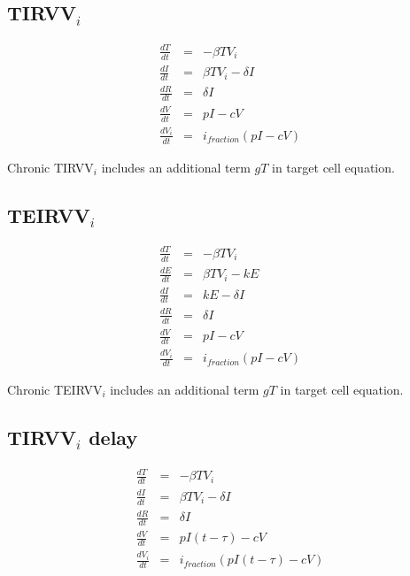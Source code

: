 \subsection{TIRVV$_i$}

\begin{equation}
\begin{array}{rcl}
\frac{dT}{dt} &=& - \beta T V_i \\
\frac{dI}{dt} &=& \beta T V_i - \delta I \\
\frac{dR}{dt} &=& \delta I \\
\frac{dV}{dt} &=& p I - c V\\
\frac{dV_i}{dt} &=& i_{fraction} (p I - c V)
\end{array}
\end{equation}

Chronic TIRVV$_i$ includes an additional term $g T$ in target cell equation.

\subsection{TEIRVV$_i$}

\begin{equation}
\begin{array}{rcl}
\frac{dT}{dt} &=& - \beta T V_i \\
\frac{dE}{dt} &=& \beta T V_i - k E \\
\frac{dI}{dt} &=& k E - \delta I \\
\frac{dR}{dt} &=& \delta I \\
\frac{dV}{dt} &=& p I - c V\\
\frac{dV_i}{dt} &=& i_{fraction} (p I - c V)
\end{array}
\end{equation}

Chronic TEIRVV$_i$ includes an additional term $g T$ in target cell equation.

\subsection{TIRVV$_i$ delay}

\begin{equation}
\begin{array}{rcl}
\frac{dT}{dt} &=& - \beta T V_i \\
\frac{dI}{dt} &=& \beta T V_i - \delta I \\
\frac{dR}{dt} &=& \delta I \\
\frac{dV}{dt} &=& p I (t - \tau) - c V\\
\frac{dV_i}{dt} &=& i_{fraction} (p I(t - \tau) - c V)
\end{array}
\end{equation}

